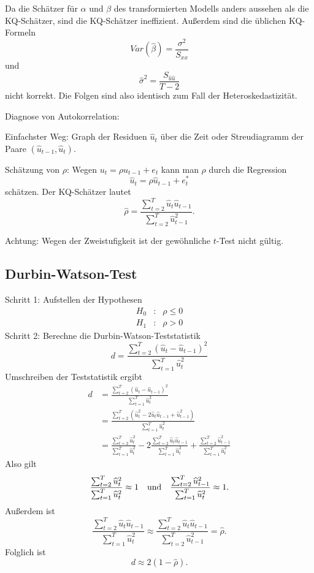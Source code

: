 \documentclass{article}
\begin{document}
Da die Schätzer für $\alpha$ und $\beta$ des transformierten Modells anders 
aussehen als die KQ-Schätzer, sind die KQ-Schätzer ineffizient.
Außerdem sind die üblichen KQ-Formeln
\[ Var(\hat{\beta})=\frac{\sigma ^{2}}{S_{xx}} \]
und 
\[ \hat{\sigma}^{2}=\frac{S_{\hat{u}\hat{u}}}{T-2} \]
nicht korrekt. Die Folgen sind also identisch zum Fall der Heteroskedastizität.

Diagnose von Autokorrelation:

Einfachster Weg: Graph der Residuen $\hat{u}_{t}$ über die Zeit oder Streudiagramm
der Paare $(\hat{u}_{t-1},\hat{u}_{t})$.

Schätzung von $\rho$: Wegen $u_{t}=\rho u_{t-1}+e_{t}$ kann man $\rho $ 
durch die Regression
\[ \widehat{u}_{t}=\rho \widehat{u}_{t-1}+e_{t}^{\ast } \]
schätzen. Der KQ-Schätzer lautet
\[ \hat{\rho}=\frac{\sum_{t=2}^T\widehat{u}_t\widehat{u}_{t-1}}{\sum_{t=2}^T\widehat{u}_{t-1}^2}. \]

Achtung: Wegen der Zweistufigkeit ist der gewöhnliche $t$-Test nicht gültig.

\subsection*{Durbin-Watson-Test}

Schritt 1: Aufstellen der Hypothesen
\begin{eqnarray*}
	H_{0} &:&\rho \leq 0 \\
	H_{1} &:&\rho >0
\end{eqnarray*}
Schritt 2: Berechne die Durbin-Watson-Teststatistik
\[ d=\frac{\sum_{t=2}^{T}(\widehat{u}_{t}-\widehat{u}_{t-1})^2}{\sum_{t=1}^T\widehat{u}_t^2} \]
Umschreiben der Teststatistik ergibt
\begin{align*}
d &=\frac{\sum_{t=2}^{T}\left( \widehat{u}_{t}-\widehat{u}_{t-1}\right)^2}
{\sum_{t=1}^{T}\widehat{u}_{t}^{2}} \\
&=\frac{\sum_{t=2}^{T}\left( \widehat{u}_{t}^{2}-2\widehat{u}_{t}\widehat{u}_{t-1}+\widehat{u}_{t-1}^2\right) }
{\sum_{t=1}^{T}\widehat{u}_{t}^{2}} \\
&=\frac{\sum_{t=2}^{T}\widehat{u}_{t}^{2}}{\sum_{t=1}^{T}\widehat{u}_t^2}
-2\frac{\sum_{t=2}^{T}\widehat{u}_{t}\widehat{u}_{t-1}}{\sum_{t=1}^{T}\widehat{u}_t^2}
+\frac{\sum_{t=2}^{T}\widehat{u}_{t-1}^{2}}{\sum_{t=1}^{T}\widehat{u}_t^2}
\end{align*}
Also gilt
\[ \frac{\sum_{t=2}^{T}\widehat{u}_{t}^{2}}{\sum_{t=1}^{T}\widehat{u}_{t}^{2}}
\approx 1\quad \text{und\quad }\frac{\sum_{t=2}^{T}\widehat{u}_{t-1}^{2}}{\sum_{t=1}^{T}\widehat{u}_{t}^{2}}\approx 1. \]
Außerdem ist
\[ \frac{\sum_{t=2}^{T}\widehat{u}_{t}\widehat{u}_{t-1}}
{\sum_{t=1}^{T}\widehat{u}_{t}^{2}}\approx \frac{\sum_{t=2}^{T}\widehat{u}_{t}\widehat{u}_{t-1}}
{\sum_{t=2}^{T}\widehat{u}_{t-1}^{2}}=\hat{\rho}. \]
Folglich ist
\[ d\approx 2\left( 1-\hat{\rho}\right) . \]
\end{document}
